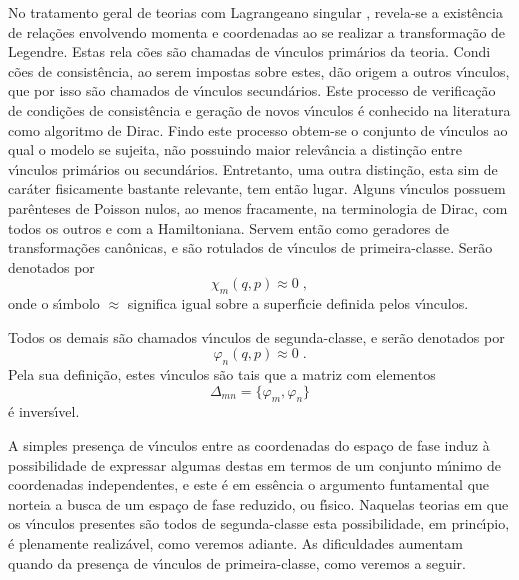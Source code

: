 \documentclass[a4paper,thmsa,12pt]{report}
\begin{document}
No tratamento geral de teorias com Lagrangeano singular \cite{dirac},
revela-se a exist\^{e}ncia de rela\c{c}\~{o}es envolvendo momenta e
coordenadas ao se realizar a transforma\c{c}\~{a}o de Legendre. Estas rela\c{%
c}\~{o}es s\~{a}o chamadas de v\'{\i}nculos prim\'{a}rios da teoria. Condi\c{%
c}\~{o}es de consist\^{e}ncia, ao serem impostas sobre estes, d\~{a}o origem
a outros v\'{\i}nculos, que por isso s\~{a}o chamados de v\'{\i}nculos
secund\'{a}rios. Este processo de verifica\c{c}\~{a}o de condi\c{c}\~{o}es
de consist\^{e}ncia e gera\c{c}\~{a}o de novos v\'{\i}nculos \'{e} conhecido
na literatura como algoritmo de Dirac. Findo este processo obtem-se o
conjunto de v\'{\i}nculos ao qual o modelo se sujeita, n\~{a}o possuindo
maior relev\^{a}ncia a distin\c{c}\~{a}o entre v\'{\i}nculos prim\'{a}rios
ou secund\'{a}rios. Entretanto, uma outra distin\c{c}\~{a}o, esta sim de
car\'{a}ter fisicamente bastante relevante, tem ent\~{a}o lugar. Alguns
v\'{\i}nculos possuem par\^{e}nteses de Poisson nulos, ao menos fracamente,
na terminologia de Dirac, com todos os outros e com a Hamiltoniana. Servem
ent\~{a}o como geradores de transforma\c{c}\~{o}es can\^{o}nicas, e s\~{a}o
rotulados de v\'{\i}nculos de primeira-classe. Ser\~{a}o denotados por 
\begin{equation}
\chi _{m}\left( q,p\right) \approx 0  \;, \label{15}
\end{equation}
onde o s\'{\i}mbolo $\approx $ significa igual sobre a superf\'{\i}cie
definida pelos v\'{\i}nculos.

Todos os demais s\~{a}o chamados v\'{\i}nculos de segunda-classe, e
ser\~{a}o denotados por 
\begin{equation}
\varphi _{n}\left( q,p\right) \approx 0  \;. \label{16}
\end{equation}
Pela sua defini\c{c}\~{a}o, estes v\'{\i}nculos s\~{a}o tais que a matriz
com elementos 
\begin{equation}
\Delta _{mn}=\{\varphi _{m},\varphi _{n}\}  \label{17}
\end{equation}
\'{e} invers\'{\i}vel.

A simples presen\c{c}a de v\'{\i}nculos entre as coordenadas do espa\c{c}o
de fase induz \`{a} possibilidade de expressar algumas destas em termos de
um conjunto m\'{\i}nimo de coordenadas independentes, e este \'{e} em
ess\^{e}ncia o argumento funtamental que norteia a busca de um espa\c{c}o de
fase reduzido, ou f\'{\i}sico. Naquelas teorias em que os v\'{\i}nculos
presentes s\~{a}o todos de segunda-classe esta possibilidade, em
princ\'{\i}pio, \'{e} plenamente realiz\'{a}vel, como veremos adiante. As
dificuldades aumentam quando da presen\c{c}a de v\'{\i}nculos de
primeira-classe, como veremos a seguir.
\end{document}
